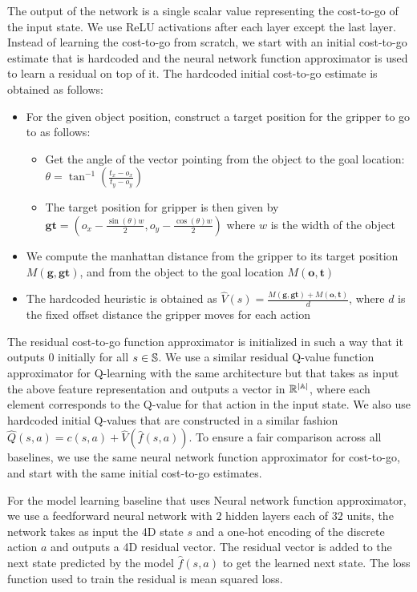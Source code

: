 The output of the network is a single scalar value representing the
cost-to-go of the input state. We use ReLU activations after each
layer except the last layer. Instead of learning the cost-to-go from
scratch, we start with an initial cost-to-go estimate that is
hardcoded and the neural network function approximator is used to
learn a residual on top of it. The hardcoded initial cost-to-go
estimate is obtained as follows:
\begin{itemize}
\item For the given object position, construct a target position for
  the gripper to go to as follows:
  \begin{itemize}
  \item Get the angle of the vector pointing from the object to the
    goal location: $\theta = \tan^{-1}(\frac{t_x - o_x}{t_y - o_y})$
  \item The target position for gripper is then given by $\mathbf{gt}
    = (o_x - \frac{\sin(\theta)w}{2}, o_y - \frac{\cos(\theta)w}{2})$
    where $w$ is the width of the object
  \end{itemize}
\item We compute the manhattan distance from the gripper to its target
  position $M(\mathbf{g}, \mathbf{gt})$, and from the object to the
  goal location $M(\mathbf{o}, \mathbf{t})$
\item The hardcoded heuristic is obtained as $\hat{V}(s) =
  \frac{M(\mathbf{g}, \mathbf{gt}) + M(\mathbf{o}, \mathbf{t})}{d}$,
  where $d$ is the fixed offset distance the gripper moves for each action
\end{itemize}
The residual cost-to-go function approximator is initialized in such a
way that it outputs $0$ initially for all $s \in \mathbb{S}$. We use
a similar residual Q-value function approximator for Q-learning with
the same architecture but that takes as input the above feature
representation and outputs a vector in $\mathbb{R}^{|\mathbb{A}|}$,
where each element corresponds to the Q-value for that action in the
input state. We also use hardcoded initial Q-values that are
constructed in a similar fashion $\hat{Q}(s, a) = c(s, a) +
\hat{V}(\hat{f}(s, a))$. To ensure a fair comparison across all
baselines, we use the same neural network function approximator for
cost-to-go, and start with the same initial cost-to-go
estimates.

For the model learning baseline that uses Neural network function
approximator, we use a feedforward neural network with $2$ hidden
layers each of $32$ units, the network takes as input the 4D state $s$
and a one-hot encoding of the discrete action $a$ and outputs a 4D
residual vector. The residual vector is added to the next state
predicted by the model $\hat{f}(s, a)$ to get the learned next
state. The loss function used to train the residual is mean
squared loss.

